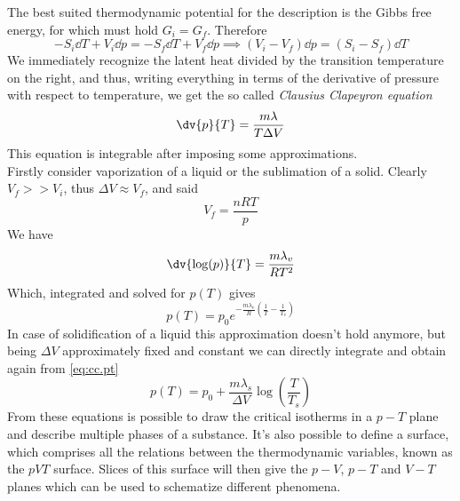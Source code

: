 \documentclass[../qm.tex]{subfiles}
\begin{document}
The best suited thermodynamic potential for the description is the Gibbs free energy, for which must hold $G_i=G_f$. Therefore
\begin{equation*}
	-S_i\dd T+V_i\dd p=-S_f\dd T+V_f\dd p\implies{}\left( V_i-V_f \right)\dd p=\left( S_i-S_f \right)\dd T
\end{equation*}
We immediately recognize the latent heat divided by the transition temperature on the right, and thus, writing everything in terms of the derivative of pressure with respect to temperature, we get the so called \emph{Clausius Clapeyron equation}
\begin{equation}
	\dv{p}{T}=\frac{m\lambda}{T\Delta V}
	\label{eq:cc.pt}
\end{equation}
This equation is integrable after imposing some approximations.\\
Firstly consider vaporization of a liquid or the sublimation of a solid. Clearly $V_f>>V_i$, thus $\Delta V\approx V_f$, and said
\begin{equation*}
	V_f=\frac{nRT}{p}
\end{equation*}
We have
\begin{equation}
	\dv{\log(p)}{T}=\frac{m\lambda_{v}}{RT^2}
	\label{eq:ccevdiff.pt}
\end{equation}
Which, integrated and solved for $p(T)$ gives
\begin{equation}
	p(T)=p_0e^{-\frac{m\lambda_{v}}{R}\left( \frac{1}{T}-\frac{1}{T_{v}} \right)}
	\label{eq:ccev.pt}
\end{equation}
In case of solidification of a liquid this approximation doesn't hold anymore, but being $\Delta V$ approximately fixed and constant we can directly integrate and obtain again from \eqref{eq:cc.pt}
\begin{equation}
	p(T)=p_0+\frac{m\lambda_s}{\Delta V}\log\left( \frac{T}{T_{s}} \right)
	\label{eq:ccsol.pt}
\end{equation}
From these equations is possible to draw the critical isotherms in a $p-T$ plane and describe multiple phases of a substance. It's also possible to define a surface, which comprises all the relations between the thermodynamic variables, known as the $pVT$ surface. Slices of this surface will then give the $p-V$, $p-T$ and $V-T$ planes which can be used to schematize different phenomena.
\end{document}
